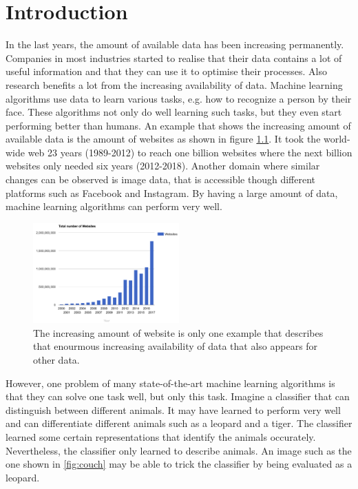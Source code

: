 \chapter{Introduction}

In the last years, the amount of available data has been increasing permanently. Companies in most industries started to realise that their data contains a lot of useful information and that they can use it to optimise their processes. Also research benefits a lot from the increasing availability of data. Machine learning algorithms use data to learn various tasks, e.g. how to recognize a person by their face. These algorithms not only do well learning such tasks, but they even start performing better than humans. An example that shows the increasing amount of available data is the amount of websites as shown in figure \ref{fig:amountwebsites}. It took the world-wide web 23 years (1989-2012) to reach one billion websites where the next billion websites only needed  six years (2012-2018). Another domain where similar changes can be observed is image data, that is accessible though different platforms such as Facebook and Instagram. By having a large amount of data, machine learning algorithms can perform very well.

\begin{figure}[h]
    \centering
    \includegraphics[width=0.5\textwidth]{images/websites}
    \caption{The increasing amount of website is only one example that describes that enourmous increasing availability of data that also appears for other data.}
    \label{fig:amountwebsites}
\end{figure}

However, one problem of many state-of-the-art machine learning algorithms is that they can solve one task well, but only this task. Imagine a classifier that can distinguish between different animals. It may have learned to perform very well and can differentiate different animals such as a leopard and a tiger. The classifier learned some certain representations that identify the animals occurately. Nevertheless, the classifier only learned to describe animals. An image such as the one shown in \ref{fig:couch} may be able to trick the classifier by being evaluated as a leopard.

